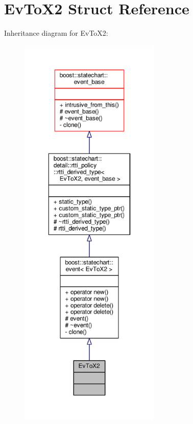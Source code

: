 \hypertarget{struct_ev_to_x2}{}\section{Ev\+To\+X2 Struct Reference}
\label{struct_ev_to_x2}


Inheritance diagram for Ev\+To\+X2\+:
\nopagebreak
\begin{figure}[H]
\begin{center}
\leavevmode
\includegraphics[height=550pt]{struct_ev_to_x2__inherit__graph}
\end{center}
\end{figure}


